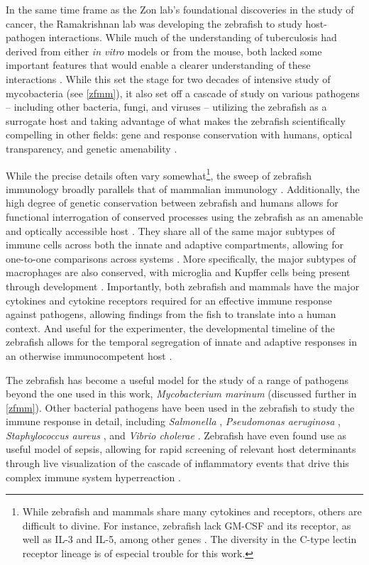 In the same time frame as the Zon lab's foundational discoveries in the study of cancer, the Ramakrishnan lab was developing the zebrafish to study host-pathogen interactions. While much of the understanding of tuberculosis had derived from either \textit{in vitro} models or from the mouse, both lacked some important features that would enable a clearer understanding of these interactions \citep{Davis2002}. While this set the stage for two decades of intensive study of mycobacteria (see \autoref{zfmm}), it also set off a cascade of study on various pathogens -- including other bacteria, fungi, and viruses -- utilizing the zebrafish as a surrogate host and taking advantage of what makes the zebrafish scientifically compelling in other fields: gene and response conservation with humans, optical transparency, and genetic amenability \citep{Kanther2010, Angosto2014, Levraud2014}.

While the precise details often vary somewhat\footnote{While zebrafish and mammals share many cytokines and receptors, others are difficult to divine. For instance, zebrafish lack GM-CSF and its receptor, as well as IL-3 and IL-5, among other genes \citep{Pazhakh2018}. The diversity in the C-type lectin receptor lineage is of especial trouble for this work.}, the sweep of zebrafish immunology broadly parallels that of mammalian immunology \citep{Zou2016, Renshaw2012}. Additionally, the high degree of genetic conservation between zebrafish and humans allows for functional interrogation of conserved processes using the zebrafish as an amenable and optically accessible host \citep{Gomes2020}. They share all of the same major subtypes of immune cells across both the innate and adaptive compartments, allowing for one-to-one comparisons across systems \citep{vanderSar2004, Thisse2002}. More specifically, the major subtypes of macrophages are also conserved, with microglia and Kupffer cells being present through development \citep{Oosterhof2015, Shwartz2019}. Importantly, both zebrafish and mammals have the major cytokines and cytokine receptors required for an effective immune response against pathogens, allowing findings from the fish to translate into a human context. And useful for the experimenter, the developmental timeline of the zebrafish allows for the temporal segregation of innate and adaptive responses in an otherwise immunocompetent host \citep{Sullivan2017, Masud2017}.

The zebrafish has become a useful model for the study of a range of pathogens beyond the one used in this work, \textit{Mycobacterium marinum} \citep{Benard2012, Brannon2009, Briolat2014} (discussed further in \autoref{zfmm}). Other bacterial pathogens have been used in the zebrafish to study the immune response in detail, including \textit{Salmonella} \citep{vanderSar2003}, \textit{Pseudomonas aeruginosa} \citep{Pont2021}, \textit{Staphylococcus aureus} \citep{Prajsnar2008}, and \textit{Vibrio cholerae} \citep{Runft2014}. Zebrafish have even found use as useful model of sepsis, allowing for rapid screening of relevant host determinants through live visualization of the cascade of inflammatory events that drive this complex immune system hyperreaction \citep{Barber2016, Philip2017, Ruyra2014}.

